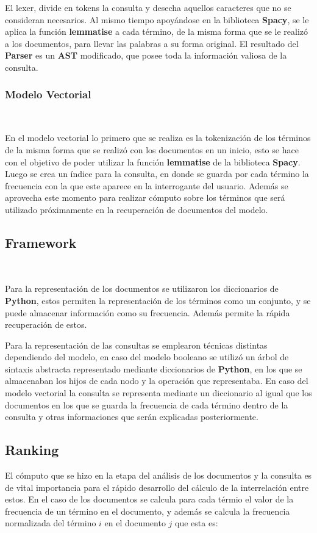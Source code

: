 \documentclass{llncs}
\begin{document}
El lexer, divide en tokens la consulta y desecha aquellos caracteres que no se consideran necesarios. Al mismo tiempo apoyándose en la biblioteca {\bfseries Spacy}, se le aplica la función {\bfseries lemmatise} a cada término, de la misma forma que se le realizó a los documentos, para llevar las palabras a su forma original. El resultado del {\bfseries Parser} es un {\bfseries AST} modificado, que posee toda la información valiosa de la consulta.

\subsubsection{Modelo Vectorial}\

En el modelo vectorial lo primero que se realiza es la tokenización de los términos de la misma forma que se realizó con los documentos en un inicio,
esto se hace con el objetivo de poder utilizar la función {\bfseries lemmatise} de la biblioteca {\bfseries Spacy}. Luego se crea un índice para la consulta, en donde se guarda por cada término la frecuencia con la que este aparece en la interrogante del usuario. Además se aprovecha este momento para realizar cómputo sobre los términos que será utilizado próximamente en la recuperación de documentos del modelo.

\subsection{Framework}\

Para la representación de los documentos se utilizaron los diccionarios de {\bfseries Python}, estos permiten la representación de los términos como un conjunto, y se puede almacenar información como su frecuencia. Además permite la rápida recuperación de estos.

Para la representación de las consultas se emplearon técnicas distintas dependiendo del modelo, en caso del modelo booleano se utilizó un árbol de sintaxis abstracta representado mediante diccionarios de {\bfseries Python}, en los que se almacenaban los hijos de cada nodo y la operación que representaba. En caso del modelo vectorial la consulta se representa mediante un diccionario al igual que los documentos en los que se guarda la frecuencia de cada término dentro de la consulta y otras informaciones que serán explicadas posteriormente.

\subsection{Ranking}
El cómputo que se hizo en la etapa del análisis de los documentos y la consulta es de vital importancia para el rápido desarrollo del cálculo de la interrelación entre estos. En el caso de los documentos se calcula para cada térmio el valor de la frecuencia de un término en el documento, y además se calcula la frecuencia normalizada del término $i$ en el documento $j$ que esta es:
\end{document}
